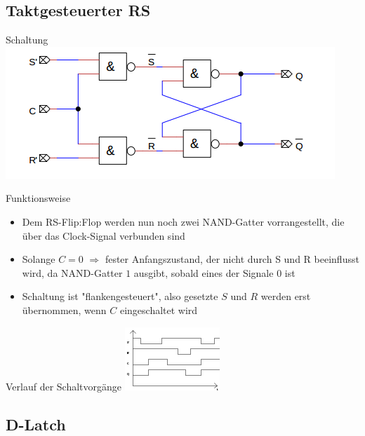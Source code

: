 \documentclass[compress,11pt]{beamer}
\begin{document}
\subsection{Taktgesteuerter RS}
\begin{frame}

\begin{block}{Schaltung}
\includegraphics[scale=0.7]{taktrs}
\end{block}

\end{frame}
\begin{frame}
\begin{block}{Funktionsweise}
\begin{itemize}
\item Dem RS-Flip:Flop werden nun noch zwei NAND-Gatter vorrangestellt, die über das Clock-Signal verbunden sind
\item Solange $C = 0$ $\Rightarrow$ fester Anfangszustand, der nicht durch S und R beeinflusst wird, da NAND-Gatter $1$ ausgibt, sobald eines der Signale $0$ ist
\item Schaltung ist "flankengesteuert", also gesetzte $S$ und $R$ werden erst übernommen, wenn $C$ eingeschaltet wird
\end{itemize}
\end{block}
\end{frame}
\begin{frame}
\begin{block}{Verlauf der Schaltvorgänge}
\includegraphics[scale=1.3]{trs}
\end{block}

\end{frame}
\subsection{D-Latch}
\end{document}
